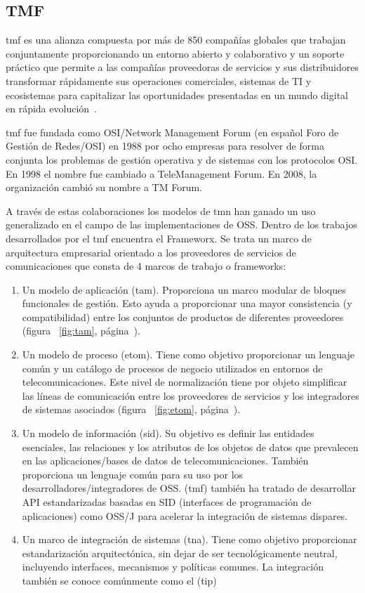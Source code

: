 \subsection{TMF}

\acrlong{tmf} es una alianza compuesta por más de 850 compañías globales que trabajan conjuntamente proporcionando un entorno abierto y colaborativo y un soporte práctico que permite a las compañías proveedoras de servicios y sus distribuidores transformar rápidamente sus operaciones comerciales, sistemas de TI y ecosistemas para capitalizar las oportunidades presentadas en un mundo digital en rápida evolución~\cite{TMFORUM}.

\acrshort{tmf} fue fundada como OSI/Network Management Forum (en español Foro de Gestión de Redes/OSI) en 1988 por ocho empresas para resolver de forma conjunta los problemas de gestión operativa y de sistemas con los protocolos OSI. En 1998 el nombre fue cambiado a TeleManagement Forum. En 2008, la organización cambió su nombre a TM Forum.

A través de estas colaboraciones los modelos de \acrshort{tmn} han ganado un uso generalizado en el campo de las implementaciones de OSS. Dentro de los trabajos desarrollados por el \acrshort{tmf} encuentra el Frameworx. Se trata un marco de arquitectura empresarial orientado a los proveedores de servicios de comunicaciones que consta de 4 marcos de trabajo o frameworks:

\begin{enumerate}
\item Un modelo de aplicación (\acrfull{tam}). Proporciona un marco modular de bloques funcionales de gestión. Esto ayuda a proporcionar una mayor consistencia (y compatibilidad) entre los conjuntos de productos de diferentes proveedores (figura ~\ref{fig:tam}, página~\pageref{fig:tam}).
\item Un modelo de proceso (\acrfull{etom}). Tiene como objetivo proporcionar un lenguaje común y un catálogo de procesos de negocio utilizados en entornos de telecomunicaciones. Este nivel de normalización tiene por objeto simplificar las líneas de comunicación entre los proveedores de servicios y los integradores de sistemas asociados (figura ~\ref{fig:etom}, página~\pageref{fig:etom}).
\item Un modelo de información (\acrfull{sid}). Su objetivo es definir las entidades esenciales, las relaciones y los atributos de los objetos de datos que prevalecen en las aplicaciones/bases de datos de telecomunicaciones. También proporciona un lenguaje común para su uso por los desarrolladores/integradores de OSS. (\acrshort{tmf}) también ha tratado de desarrollar API estandarizadas basadas en SID (interfaces de programación de aplicaciones) como OSS/J para acelerar la integración de sistemas dispares.
\item Un marco de integración de sistemas (\acrfull{tna}). Tiene como objetivo proporcionar estandarización arquitectónica, sin dejar de ser tecnológicamente neutral, incluyendo interfaces, mecanismos y políticas comunes. La integración también se conoce comúnmente como el (\acrfull{tip})
\end{enumerate}

